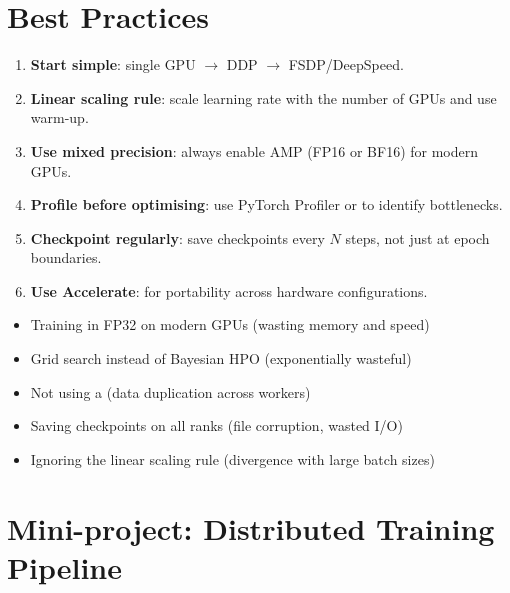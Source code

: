\section{Best Practices}

\begin{bestpractice}[title=\textbf{Distributed training golden rules}]
\begin{enumerate}
  \item \textbf{Start simple}: single GPU $\to$ DDP $\to$ FSDP/DeepSpeed.
  \item \textbf{Linear scaling rule}: scale learning rate with the number
    of GPUs and use warm-up.
  \item \textbf{Use mixed precision}: always enable AMP (FP16 or BF16)
    for modern GPUs.
  \item \textbf{Profile before optimising}: use PyTorch Profiler or
     to identify bottlenecks.
  \item \textbf{Checkpoint regularly}: save checkpoints every $N$ steps,
    not just at epoch boundaries.
  \item \textbf{Use Accelerate}: for portability across hardware
    configurations.
\end{enumerate}
\end{bestpractice}

\begin{antipattern}[title=\textbf{Common anti-patterns}]
\begin{itemize}
  \item Training in FP32 on modern GPUs (wasting memory and speed)
  \item Grid search instead of Bayesian HPO (exponentially wasteful)
  \item Not using a  (data duplication across
    workers)
  \item Saving checkpoints on all ranks (file corruption, wasted I/O)
  \item Ignoring the linear scaling rule (divergence with large batch
    sizes)
\end{itemize}
\end{antipattern}

\section{Mini-project: Distributed Training Pipeline}
\label{sec:mini-project-ch6}

